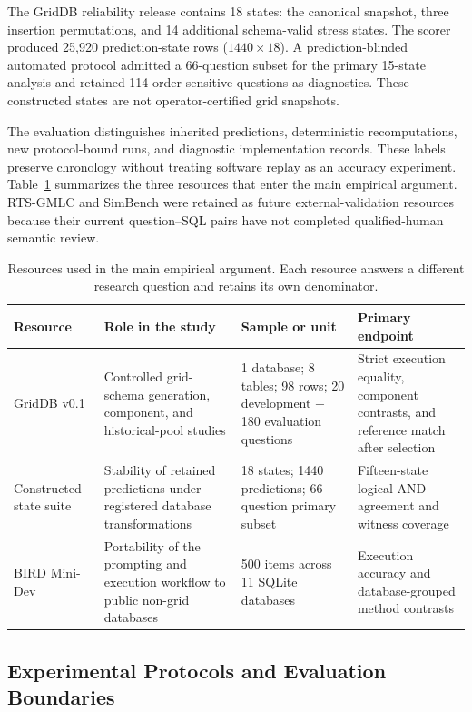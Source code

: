 \documentclass[applsci,article,submit,moreauthors]{Definitions/mdpi}
\begin{document}
The GridDB reliability release contains 18 states: the canonical snapshot, three insertion permutations, and 14 additional schema-valid stress states. The scorer produced 25,920 prediction-state rows ($1440\times18$). A prediction-blinded automated protocol admitted a 66-question subset for the primary 15-state analysis and retained 114 order-sensitive questions as diagnostics. These constructed states are not operator-certified grid snapshots.

The evaluation distinguishes inherited predictions, deterministic recomputations, new protocol-bound runs, and diagnostic implementation records. These labels preserve chronology without treating software replay as an accuracy experiment. Table~\ref{tab:resources} summarizes the three resources that enter the main empirical argument. RTS-GMLC and SimBench were retained as future external-validation resources because their current question--SQL pairs have not completed qualified-human semantic review.

\begin{table}[htbp]
\caption{Resources used in the main empirical argument. Each resource answers a different research question and retains its own denominator.}
\label{tab:resources}
\centering
\small
\setlength{\tabcolsep}{2pt}
\begin{tabular}{p{2.6cm}p{4.5cm}p{3.0cm}p{3.0cm}}
\toprule
Resource & Role in the study & Sample or unit & Primary endpoint\\
\midrule
GridDB v0.1 & Controlled grid-schema generation, component, and historical-pool studies & 1 database; 8 tables; 98 rows; 20 development + 180 evaluation questions & Strict execution equality, component contrasts, and reference match after selection\\
Constructed-state suite & Stability of retained predictions under registered database transformations & 18 states; 1440 predictions; 66-question primary subset & Fifteen-state logical-AND agreement and witness coverage\\
BIRD Mini-Dev & Portability of the prompting and execution workflow to public non-grid databases & 500 items across 11 SQLite databases & Execution accuracy and database-grouped method contrasts\\
\bottomrule
\end{tabular}
\end{table}

\subsection{Experimental Protocols and Evaluation Boundaries}
\end{document}
